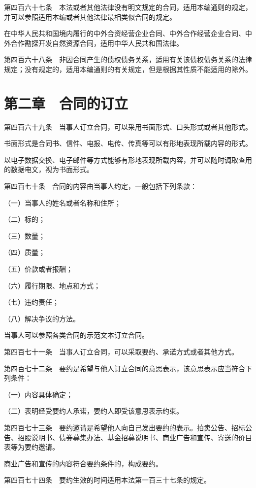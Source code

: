 \documentclass[UTF8,12pt,a4paper]{ctexbook}
\begin{document}
第四百六十七条　本法或者其他法律没有明文规定的合同，适用本编通则的规定，并可以参照适用本编或者其他法律最相类似合同的规定。

在中华人民共和国境内履行的中外合资经营企业合同、中外合作经营企业合同、中外合作勘探开发自然资源合同，适用中华人民共和国法律。

第四百六十八条　非因合同产生的债权债务关系，适用有关该债权债务关系的法律规定；没有规定的，适用本编通则的有关规定，但是根据其性质不能适用的除外。

\section*{第二章　合同的订立}

第四百六十九条　当事人订立合同，可以采用书面形式、口头形式或者其他形式。

书面形式是合同书、信件、电报、电传、传真等可以有形地表现所载内容的形式。

以电子数据交换、电子邮件等方式能够有形地表现所载内容，并可以随时调取查用的数据电文，视为书面形式。

第四百七十条　合同的内容由当事人约定，一般包括下列条款：

（一）当事人的姓名或者名称和住所；

（二）标的；

（三）数量；

（四）质量；

（五）价款或者报酬；

（六）履行期限、地点和方式；

（七）违约责任；

（八）解决争议的方法。

当事人可以参照各类合同的示范文本订立合同。

第四百七十一条　当事人订立合同，可以采取要约、承诺方式或者其他方式。

第四百七十二条　要约是希望与他人订立合同的意思表示，该意思表示应当符合下列条件：

（一）内容具体确定；

（二）表明经受要约人承诺，要约人即受该意思表示约束。

第四百七十三条　要约邀请是希望他人向自己发出要约的表示。拍卖公告、招标公告、招股说明书、债券募集办法、基金招募说明书、商业广告和宣传、寄送的价目表等为要约邀请。

商业广告和宣传的内容符合要约条件的，构成要约。

第四百七十四条　要约生效的时间适用本法第一百三十七条的规定。
\end{document}
